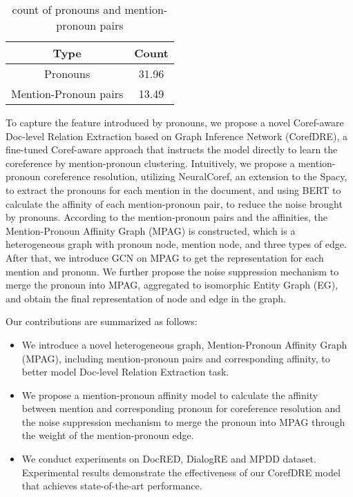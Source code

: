 \documentclass{article}
\begin{document}
\begin{table}[ht]
    \centering
     \setlength{\belowcaptionskip}{-0.2cm}
    \begin{tabular}{c c}
    \hline
         Type&Count  \\\hline
         Pronouns&31.96  \\
         Mention-Pronoun pairs&13.49\\
         \hline
    \end{tabular}
    \caption{count of pronouns and mention-pronoun pairs}
    \label{tab1}
\end{table}

To capture the feature introduced by pronouns, we propose a novel Coref-aware Doc-level Relation Extraction based on Graph Inference Network (CorefDRE), a fine-tuned Coref-aware approach that instructs the model directly to learn the coreference by mention-pronoun clustering. Intuitively, we propose a mention-pronoun coreference resolution, utilizing NeuralCoref, an extension to the Spacy, to extract the pronouns for each mention in the document, and using BERT to calculate the affinity of each mention-pronoun pair, to reduce the noise brought by pronouns. According to the mention-pronoun pairs and the affinities, the Mention-Pronoun Affinity Graph (MPAG) is constructed, which is a heterogeneous graph with pronoun node, mention node, and three types of edge. After that, we introduce GCN on MPAG to get the representation for each mention and pronoun. We further propose the noise suppression mechanism to merge the pronoun into MPAG, aggregated to isomorphic Entity Graph (EG), and obtain the final representation of node and edge in the graph.

Our contributions are summarized as follows: 
\begin{itemize}

\item We introduce a novel heterogeneous graph, Mention-Pronoun Affinity Graph (MPAG), including mention-pronoun pairs and corresponding affinity, to better model Doc-level Relation Extraction task.

\item We propose a mention-pronoun affinity model to calculate the affinity between mention and corresponding pronoun for coreference resolution and the noise suppression mechanism to merge the pronoun into MPAG through the weight of the mention-pronoun edge.


\item We conduct experiments on DocRED, DialogRE and MPDD dataset. Experimental results demonstrate the effectiveness of our CorefDRE model that achieves state-of-the-art performance.

\end{itemize}
\end{document}
